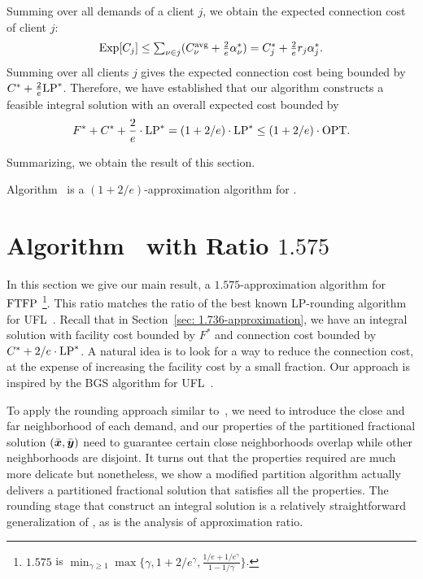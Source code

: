 \documentclass[11pt]{article}
\begin{document}
Summing over all demands of a client $j$, we obtain the
expected connection cost of client $j$:
%
\begin{equation*}
  \mbox{\rm Exp}[C_j] \leq {\textstyle\sum_{\nu\in j} (C^{{\mbox{\scriptsize\rm avg}}}_{\nu} + \frac{2}{e}\alpha_{\nu}^\ast) }
  = \textstyle{ C_j^\ast + \frac{2}{e}r_j\alpha_j^\ast}.
\end{equation*}
%
Summing over all clients $j$ gives the expected connection
cost being bounded by $C^\ast +
\frac{2}{e}\mbox{\rm LP}^\ast$. Therefore, we have established that
our algorithm constructs a feasible integral solution with
an overall expected cost bounded by
%
\begin{equation*}
  \label{eq:chudakall}
  	F^\ast + C^\ast + \frac{2}{e}\cdot \mbox{\rm LP}^\ast = (1+2/e)\cdot \mbox{\rm LP}^\ast
  \leq (1+2/e)\cdot \mbox{\rm OPT}.
\end{equation*}

Summarizing, we obtain the result of this section.

\begin{theorem}\label{thm:1736}
  Algorithm~{\ECHU} is a $(1+2/e)$-approximation algorithm for \FTFP.
\end{theorem}


\section{Algorithm~{\EBGS} with Ratio $1.575$}\label{sec:
  1.575-approximation}
In this section we give our main result, a $1.575$-approximation algorithm
for $\mbox{\rm FTFP}$
%
\footnote{$1.575$ is $\min_{\gamma\geq 1}\max\{\gamma,
  1+2/e^\gamma, \frac{1/e+1/e^\gamma}{1-1/\gamma}\}$.}. 
%
This ratio matches the ratio of the best known LP-rounding
algorithm for UFL~\cite{ByrkaGS10}. Recall that in
Section~\ref{sec: 1.736-approximation}, we have an integral
solution with facility cost bounded by $F^\ast$ and
connection cost bounded by $C^\ast + 2/e\cdot\mbox{\rm LP}^\ast$. A
natural idea is to look for a way to reduce the connection
cost, at the expense of increasing the facility cost by a
small fraction. Our approach is inspired by the BGS
algorithm for UFL~\cite{ByrkaGS10}.

To apply the rounding approach similar to~\cite{ByrkaGS10},
we need to introduce the close and far neighborhood of each
demand, and our properties of the partitioned fractional
solution $(\bar{\boldsymbol{x}},\bar{\boldsymbol{y}})$ need to guarantee certain close
neighborhoods overlap while other neighborhoods are
disjoint. It turns out that the properties required are much
more delicate but nonetheless, we show a modified partition
algorithm actually delivers a partitioned fractional
solution that satisfies all the properties. The rounding
stage that construct an integral solution is a relatively
straightforward generalization of \cite{ByrkaGS10}, as is
the analysis of approximation ratio.
\end{document}
